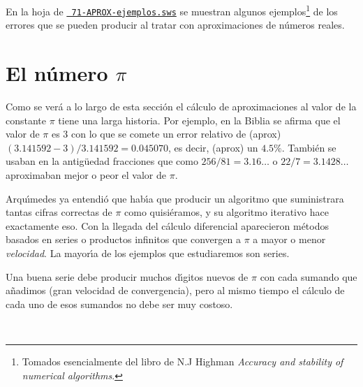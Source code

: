 En la hoja de {\sage} \href{http://sage.mat.uam.es:8888/home/pub/17/}{\tt
71-APROX-ejemplos.sws} se muestran algunos ejemplos\footnote{Tomados
esencialmente del libro de N.J Highman {\itshape Accuracy and stability of
numerical algorithms}.} de los errores que se pueden producir al tratar con
aproximaciones de n\'umeros reales.





\section{El n\'umero $\pi$}


Como se ver\'a a lo largo de esta secci\'on  el c\'alculo de aproximaciones al
valor de la constante $\pi$ tiene 
una larga historia. Por ejemplo, en la Biblia se afirma que el valor de $\pi$ es
 $3$ con lo que se comete un error relativo de (aprox)
$(3{.}141592-3)/3{.}141592=0{.}045070$, es decir, (aprox) un $4{.}5\%.$
Tambi\'en se usaban en la antig\"uedad fracciones 
que como $256/81=3{.}16\dots$ o $22/7=3{.}1428\dots$  aproximaban mejor o peor
el valor de $\pi$.


Arqu\'{\i}medes ya entendi\'o que hab\'{\i}a que producir un algoritmo que
suministrara tantas cifras correctas de $\pi$ como quisiéramos, y su algoritmo
iterativo hace exactamente eso. Con la llegada del c\'alculo diferencial 
aparecieron m\'etodos basados en series o productos infinitos que convergen a
$\pi$ a mayor o menor {\itshape velocidad}. La mayor\'{\i}a de los ejemplos
que estudiaremos son series.

Una buena serie debe producir muchos d\'{\i}gitos nuevos de $\pi$ con cada
sumando que a\~nadimos (gran velocidad de convergencia), pero al mismo tiempo el
c\'alculo de cada uno de esos sumandos no debe ser muy costoso. 

\

